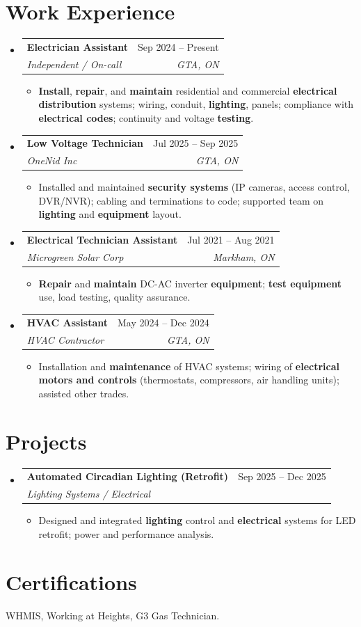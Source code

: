 \documentclass[letterpaper,11pt]{article}
\makeatletter
\newcommand{\resumeItem}[1]{\item\small{{#1 \vspace{-2pt}}}}
\newcommand{\resumeSubheading}[4]{
  \vspace{-4pt}\item
    \begin{tabular*}{0.97\textwidth}[t]{l@{\extracolsep{\fill}}r}
      \textbf{#1} & #2 \\
      \textit{\small #3} & \textit{\small #4} \\
    \end{tabular*}\vspace{-8pt}
}
\newcommand{\resumeSubHeadingListStart}{\begin{itemize}[leftmargin=0.15in, label={}]}
\newcommand{\resumeSubHeadingListEnd}{\end{itemize}}
\newcommand{\resumeItemListStart}{\begin{itemize}}
\newcommand{\resumeItemListEnd}{\end{itemize}\vspace{-5pt}}
\makeatother
\begin{document}
\section{Work Experience}
\resumeSubHeadingListStart

\resumeSubheading
  {Electrician Assistant}{Sep 2024 -- Present}
  {Independent / On-call}{GTA, ON}
\resumeItemListStart
  \resumeItem{\textbf{Install}, \textbf{repair}, and \textbf{maintain} residential and commercial \textbf{electrical distribution} systems; wiring, conduit, \textbf{lighting}, panels; compliance with \textbf{electrical codes}; continuity and voltage \textbf{testing}.}
\resumeItemListEnd

\resumeSubheading
  {Low Voltage Technician}{Jul 2025 -- Sep 2025}
  {OneNid Inc}{GTA, ON}
\resumeItemListStart
  \resumeItem{Installed and maintained \textbf{security systems} (IP cameras, access control, DVR/NVR); cabling and terminations to code; supported team on \textbf{lighting} and \textbf{equipment} layout.}
\resumeItemListEnd

\resumeSubheading
  {Electrical Technician Assistant}{Jul 2021 -- Aug 2021}
  {Microgreen Solar Corp}{Markham, ON}
\resumeItemListStart
  \resumeItem{\textbf{Repair} and \textbf{maintain} DC-AC inverter \textbf{equipment}; \textbf{test equipment} use, load testing, quality assurance.}
\resumeItemListEnd

\resumeSubheading
  {HVAC Assistant}{May 2024 -- Dec 2024}
  {HVAC Contractor}{GTA, ON}
\resumeItemListStart
  \resumeItem{Installation and \textbf{maintenance} of HVAC systems; wiring of \textbf{electrical motors and controls} (thermostats, compressors, air handling units); assisted other trades.}
\resumeItemListEnd

\resumeSubHeadingListEnd

\section{Projects}
\resumeSubHeadingListStart
\resumeSubheading
  {Automated Circadian Lighting (Retrofit)}{Sep 2025 -- Dec 2025}
  {Lighting Systems / Electrical}{ }
\resumeItemListStart
  \resumeItem{Designed and integrated \textbf{lighting} control and \textbf{electrical} systems for LED retrofit; power and performance analysis.}
\resumeItemListEnd
\resumeSubHeadingListEnd

\section{Certifications}
WHMIS, Working at Heights, G3 Gas Technician.
\end{document}

